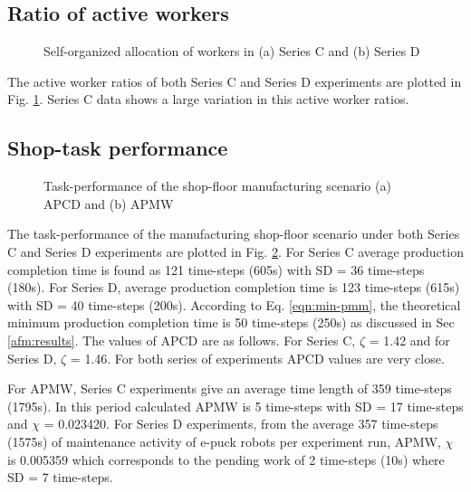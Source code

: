 \subsection*{Ratio of active workers}
\begin{figure}[H]
\centering
\hspace*{0.5cm}
\newline
{}
\caption{\small Self-organized allocation of workers in (a) Series C and (b) Series D}
\label{fig:plasticity-SC-SD} 
\end{figure}
%
The active worker ratios of both Series C and Series D experiments are plotted in Fig. \ref{fig:plasticity-SC-SD}. Series C data shows a large variation in this active worker ratios.
\subsection*{Shop-task performance}
\begin{figure}[H]
\centering
\hspace*{0.5cm}
\newline
{}
\caption{\small Task-performance of the shop-floor manufacturing scenario (a) APCD and (b) APMW}
\label{fig:vms-SC-SD} 
\end{figure}
The task-performance of the manufacturing shop-floor scenario under both Series C and Series D experiments are plotted in Fig. \ref{fig:vms-SC-SD}. For Series C  average production completion time is found as 121 time-steps (605s) with SD = 36 time-steps (180s). For Series D,  average production completion time is 123 time-steps (615s) with SD = 40 time-steps (200s). According to Eq. \ref{eqn:min-pmm}, the theoretical minimum production completion time is 50 time-steps (250s) as discussed in Sec \ref{afm:results}.  The values of APCD are as follows. For Series C, $\zeta$ = 1.42 and for Series D, $\zeta$ = 1.46. For both series of experiments APCD values are very close.

For APMW, Series C experiments give an average time length of 359 time-steps (1795s). In this period  calculated APMW is 5 time-steps with SD = 17 time-steps and $\chi$ = 0.023420. For Series D experiments, from the average 357 time-steps (1575s) of maintenance activity of e-puck robots per experiment run, APMW, $\chi$ is 0.005359 which corresponds to the pending work of 2 time-steps (10s) where SD = 7 time-steps.
